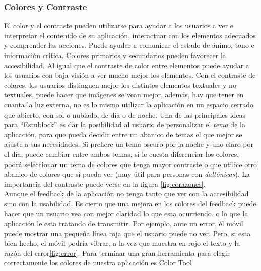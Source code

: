 \subsubsection{Colores y Contraste}
El color y el contraste pueden utilizarse para ayudar a los usuarios a ver e interpretar el contenido de su aplicación, interactuar con los elementos adecuados y comprender las acciones. Puede ayudar a comunicar el estado de ánimo, tono e información crítica. Colores primarios y secundarios pueden favorecer la accesibilidad. Al igual que el contraste de color entre elementos puede ayudar a los usuarios con baja visión a ver mucho mejor los elementos. Con el contraste de colores, los usuarios distinguen mejor los distintos elementos textuales y no textuales, puede hacer que imágenes se vean mejor, además, hay que tener en cuanta la luz externa, no es lo mismo utilizar la aplicación en un espacio cerrado que abierto, con sol o nublado, de día o de noche. Una de las principales ideas para ``Estublock'' es dar la posibilidad al usuario de personalizar el \emph{tema} de la aplicación, para que pueda decidir entre un abanico de temas el que mejor se ajuste a sus necesidades. Si prefiere un tema oscuro por la noche y uno claro por el día, puede cambiar entre ambos temas, si le cuesta diferenciar los colores, podrá seleccionar un tema de colores que tenga mayor contraste o que utilice otro abanico de colores que sí pueda ver (muy útil para personas con \emph{daltónicas}). La importancia del contraste puede verse en la figura \ref{fig:corazones}. \\

Aunque el feedback de la aplicación no tenga tanto que ver con la accesibilidad sino con la usabilidad. Es cierto que una mejora en los colores del feedback puede hacer que un usuario vea con mejor claridad lo que esta ocurriendo, o lo que la aplicación le esta tratando de transmitir. Por ejemplo, ante un error, él móvil puede mostrar una pequeña línea roja que el usuario puede no ver. Pero, si esta bien hecho, el móvil podría vibrar, a la vez que muestra en rojo el texto y la razón del error\ref{fig:error}. Para terminar una gran herramienta para elegir correctamente los colores de nuestra aplicación es \href{https://material.io/resources/color/#!/?view.left=1&view.right=0}{Color Tool} \\

